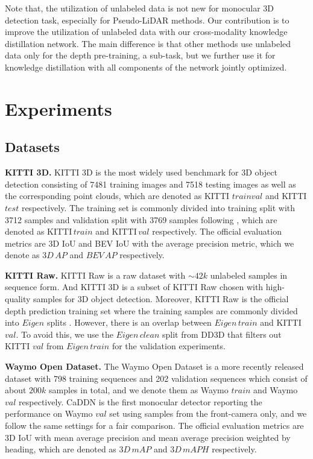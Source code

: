 \documentclass[runningheads]{llncs}
\begin{document}
Note that, the utilization of unlabeled data is not new for monocular 3D detection task, especially for Pseudo-LiDAR methods.
Our contribution is to improve the utilization of unlabeled data with our cross-modality knowledge distillation network. 
The main difference is that other methods use unlabeled data only for the depth pre-training, a sub-task, but we further use it for knowledge distillation with all components of the network jointly optimized.



\section{Experiments}

\subsection{Datasets}

\textbf{KITTI 3D.}
KITTI 3D \cite{KITTI} is the most widely used benchmark for 3D object detection consisting of 7481 training images and 7518 testing images as well as the corresponding point clouds, which are denoted as KITTI $trainval$ and KITTI $test$ respectively.
The training set is commonly divided into training split with 3712 samples and validation split with 3769 samples following \cite{kittisplit}, which are denoted as KITTI\,$train$ and KITTI\,$val$ respectively.
The official evaluation metrics are 3D IoU and BEV IoU with the average precision metric, which we denote as $3D\,AP$ and $BEV\,AP$ respectively.


\noindent\textbf{KITTI Raw.}
KITTI Raw \cite{KITTIRaw} is a raw dataset with $\sim 42k$ unlabeled samples in sequence form. 
And KITTI 3D is a subset of KITTI Raw chosen with high-quality samples for 3D object detection.
Moreover, KITTI Raw is the official depth prediction training set where the training samples are commonly divided into $Eigen$ splits \cite{eigensplit}.
However, there is an overlap \cite{arewemissing,PL} between $Eigen\,train$ and KITTI $val$.
To avoid this, we use the $Eigen\,clean$ split from DD3D \cite{dd3d} that filters out KITTI $val$ from $Eigen\,train$ for the validation experiments.



\noindent\textbf{Waymo Open Dataset.}
The Waymo Open Dataset \cite{Waymo} is a more recently released dataset with 798 training sequences and 202 validation sequences which consist of about $200k$ samples in total, and we denote them as Waymo $train$ and Waymo $val$ respectively.
CaDDN \cite{CADDN} is the first monocular detector reporting the performance on Waymo $val$ set using samples from the front-camera only, and we follow the same settings for a fair comparison.
The official evaluation metrics are 3D IoU with mean average precision and mean average precision weighted by heading, which are denoted as $3D\,mAP$ and $3D\,mAPH$ respectively.
\end{document}
